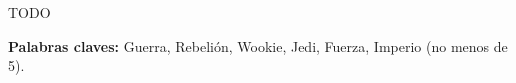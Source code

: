 \chapter*{\runtitulo}

TODO

\bigskip

\noindent\textbf{Palabras claves:} Guerra, Rebelión, Wookie, Jedi, Fuerza, Imperio (no menos de 5).